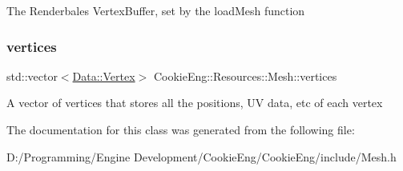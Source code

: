 The Renderbales Vertex\+Buffer, set by the load\+Mesh function \mbox{\label{struct_cookie_eng_1_1_resources_1_1_mesh_aa2d9365b3bb9855de51053a1bbde84a1}} 
\subsubsection{\texorpdfstring{vertices}{vertices}}
{\footnotesize\ttfamily std\+::vector$<$\hyperlink{struct_cookie_eng_1_1_data_1_1_vertex}{Data\+::\+Vertex}$>$ Cookie\+Eng\+::\+Resources\+::\+Mesh\+::vertices}

A vector of vertices that stores all the positions, UV data, etc of each vertex 

The documentation for this class was generated from the following file\+:\begin{DoxyCompactItemize}
\item 
D\+:/\+Programming/\+Engine Development/\+Cookie\+Eng/\+Cookie\+Eng/include/Mesh.\+h\end{DoxyCompactItemize}
